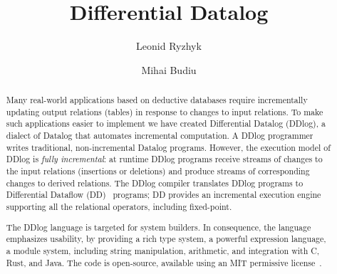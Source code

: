 \documentclass{svproc}
\author{
        Leonid Ryzhyk \and
        Mihai Budiu}
\institute{VMware Research}
\title{Differential Datalog}
\date{}
\begin{document}
\maketitle

\begin{abstract}

Many real-world applications based on deductive databases require
incrementally updating output relations (tables) in response to
changes to input relations.  To make such applications easier to
implement we have created Differential Datalog (DDlog), a dialect of
Datalog that automates incremental computation.  A DDlog programmer
writes traditional, non-incremental Datalog programs.  However, the execution
model of DDlog is \emph{fully incremental}: at runtime DDlog programs
receive streams of changes to the input relations (insertions or
deletions) and produce streams of corresponding changes to derived
relations.  The DDlog compiler translates DDlog programs to
Differential Dataflow (DD)~\cite{differential-dataflow-paper}
programs; DD provides an incremental execution engine supporting all
the relational operators, including fixed-point.

The DDlog language is targeted for system builders.  In consequence,
the language emphasizes usability, by providing a rich type system, a
powerful expression language, a module system, including string
manipulation, arithmetic, and integration with C, Rust, and Java.  The
code is open-source, available using an MIT permissive license~\cite{ddlog}.
\end{abstract}










\end{document}
